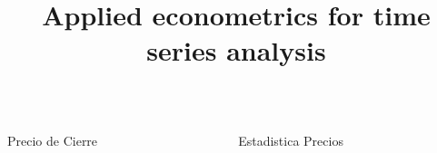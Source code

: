 \documentclass[final, xcolor=table]{beamer}\usepackage[]{graphicx}\usepackage[]{color}
\title{\Huge Applied econometrics for time series analysis }
\begin{document}

\begin{columns}[t]


\begin{column}{.66 \linewidth}

  \begin{block}{Precio de Cierre}

  \end{block}
  
\end{column}


\begin{column}{.32 \linewidth}
  \begin{block}{Estadistica Precios}

  \end{block}
\end{column}

\end{columns}
\end{document}
